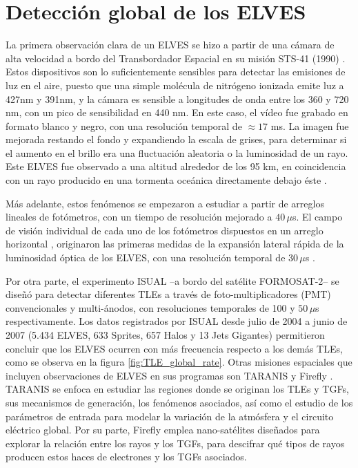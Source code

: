 \documentclass[12pt,oneside,openany,letter]{book}
\begin{document}
\chapter{Detección global de los ELVES}\label{deteccion}
La primera observación clara de un ELVES se hizo a partir de una cámara de alta velocidad a bordo del Transbordador Espacial en su misión STS-41 (1990) \cite{BoeckEtal1992}. Estos dispositivos son lo suficientemente sensibles para detectar las emisiones de luz en el aire, puesto que una simple molécula de nitrógeno ionizada emite luz a 427nm y 391nm, y la cámara es sensible a longitudes de onda entre los 360 y 720 nm, con un pico de sensibilidad en 440 nm. En este caso, el vídeo fue grabado en formato blanco y negro, con una resolución temporal de $\approx 17$ ms. La imagen fue mejorada restando el fondo y expandiendo la escala de grises, para determinar si el aumento en el brillo era una fluctuación aleatoria o la luminosidad de un rayo. Este ELVES fue observado a una altitud alrededor de los 95 km, en coincidencia con un rayo producido en una tormenta oceánica directamente debajo \'este  \cite{BoeckEtal1992}.  

Más adelante, estos fenómenos se empezaron a estudiar a partir de arreglos lineales de fotómetros, con un tiempo de resolución mejorado a $40\,\mu$s. El campo de visión individual de cada uno de los fotómetros dispuestos en un arreglo horizontal \cite{InanEtal1997}, originaron las primeras medidas de la expansión lateral rápida de la luminosidad óptica de los ELVES, con una resolución temporal de $30\,\mu$s . 

Por otra parte, el experimento ISUAL \cite{chen2008} --a bordo del sat\'elite FORMOSAT-2-- se diseñó para detectar diferentes TLEs a través de foto-multiplicadores (PMT) convencionales y multi-ánodos, con resoluciones temporales de 100 y $50\,\mu$s respectivamente. Los datos registrados por ISUAL desde julio de 2004 a junio de 2007 (5.434 ELVES, 633 Sprites, 657 Halos y 13 Jets Gigantes) permitieron concluir que los ELVES ocurren con m\'as frecuencia respecto a los demás TLEs, como se observa en la figura \ref{fig:TLE_global_rate}. Otras misiones espaciales que incluyen observaciones de ELVES en sus programas son TARANIS \cite{lefeuvre2008taranis} y Firefly \cite{rowland2011nsf}. TARANIS se enfoca en estudiar las regiones donde se originan los TLEs y TGFs, sus mecanismos de generación, los fenómenos asociados, así como el estudio de los parámetros de entrada para modelar la variación de la atmósfera y el circuito eléctrico global. Por su parte, Firefly emplea nano-satélites diseñados para explorar la relación entre los rayos y los TGFs, para descifrar qué tipos de rayos producen estos haces de electrones y los TGFs asociados.
\end{document}
